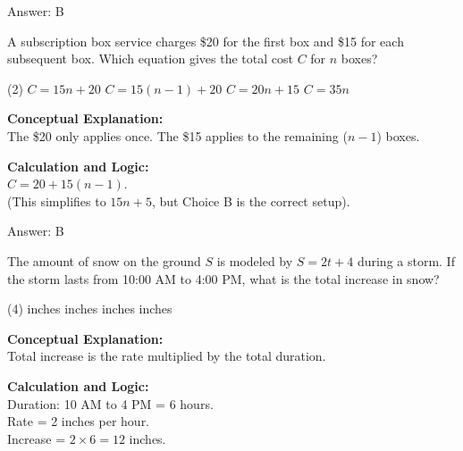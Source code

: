 \documentclass[11pt,paper=a4,answers]{exam}
\begin{document}
\begin{questions}
\begin{solution}
\vspace{15pt}
Answer: \colorbox{yellow!100}{B}
\end{solution}

\vspace{20pt}

\question
A subscription box service charges \$20 for the first box and \$15 for each subsequent box. Which equation gives the total cost $C$ for $n$ boxes?
\begin{tasks}(2)
    \task $C = 15n + 20$
    \task $C = 15(n - 1) + 20$
    \task $C = 20n + 15$
    \task $C = 35n$
\end{tasks}

\begin{solution}
\textbf{Conceptual Explanation:} \\
The \$20 only applies once. The \$15 applies to the remaining ($n-1$) boxes.

\vspace{10pt}
\textbf{Calculation and Logic:} \\
$C = 20 + 15(n - 1)$. \\
(This simplifies to $15n + 5$, but Choice B is the correct setup).

\vspace{15pt}
Answer: \colorbox{yellow!100}{B}
\end{solution}

\vspace{20pt}

\question
The amount of snow on the ground $S$ is modeled by $S = 2t + 4$ during a storm. If the storm lasts from 10:00 AM to 4:00 PM, what is the total increase in snow?
\begin{tasks}(4)
     inches
     inches
     inches
     inches
\end{tasks}

\begin{solution}
\textbf{Conceptual Explanation:} \\
Total increase is the rate multiplied by the total duration.

\vspace{10pt}
\textbf{Calculation and Logic:} \\
Duration: 10 AM to 4 PM = 6 hours. \\
Rate = 2 inches per hour. \\
Increase = $2 \times 6 = 12$ inches.


\end{solution}
\end{questions}
\end{document}
